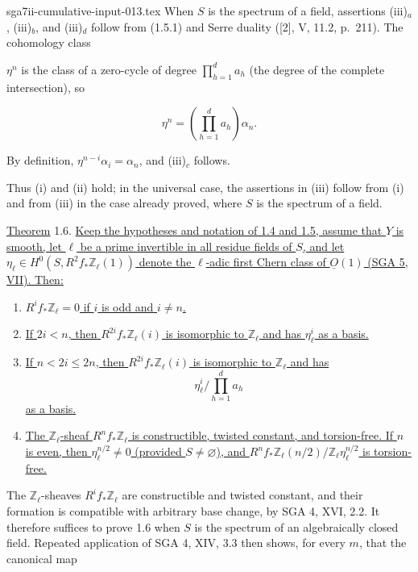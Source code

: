 \begin{filecontents*}{sga7ii-cumulative-input-013.tex}
When $S$ is the spectrum of a field, assertions (iii)$_a$, (iii)$_b$, and
(iii)$_d$ follow from (1.5.1) and Serre duality ([2], V, 11.2, p.~211).
The cohomology class


$\eta^n$ is the class of a zero-cycle of degree
$\prod_{h=1}^d a_h$ (the degree of the complete intersection), so

\begin{equation*}
\eta^n=\left(\prod_{h=1}^d a_h\right)\alpha_n.
\end{equation*}

By definition, $\eta^{n-i}\alpha_i=\alpha_n$, and (iii)$_c$ follows.

Thus (i) and (ii) hold; in the universal case, the assertions in (iii)
follow from (i) and from (iii) in the case already proved, where $S$ is the
spectrum of a field.

\underline{Theorem} 1.6. \underline{Keep the hypotheses and notation of
1.4 and 1.5, assume that $Y$ is smooth, let $\ell$ be a prime invertible in
all residue fields of $S$, and let
$\eta_\ell\in H^0(S,R^2f_*\mathbb Z_\ell(1))$ denote the $\ell$-adic first
Chern class of $\underline O(1)$ (SGA 5, VII).  Then:}

\begin{enumerate}[label=(\roman*),leftmargin=2.6em]
\item \underline{$R^if_*\mathbb Z_\ell=0$ if $i$ is odd and $i\ne n$.}

\item \underline{If $2i<n$, then $R^{2i}f_*\mathbb Z_\ell(i)$ is
isomorphic to $\mathbb Z_\ell$ and has $\eta_\ell^i$ as a basis.}

\item \underline{If $n<2i\leq2n$, then
$R^{2i}f_*\mathbb Z_\ell(i)$ is isomorphic to $\mathbb Z_\ell$ and has}
\begin{equation*}
\eta_\ell^i\bigg/\prod_{h=1}^d a_h
\end{equation*}
\underline{as a basis.}

\item \underline{The $\mathbb Z_\ell$-sheaf $R^nf_*\mathbb Z_\ell$ is
constructible, twisted constant, and torsion-free.  If $n$ is even, then
$\eta_\ell^{n/2}\ne0$ (provided $S\ne\varnothing$), and
$R^nf_*\mathbb Z_\ell(n/2)/\mathbb Z_\ell\eta_\ell^{n/2}$ is torsion-free.}
\end{enumerate}

The $\mathbb Z_\ell$-sheaves $R^if_*\mathbb Z_\ell$ are constructible and
twisted constant, and their formation is compatible with arbitrary base
change, by SGA 4, XVI, 2.2.  It therefore suffices to prove 1.6 when $S$ is
the spectrum of an algebraically closed field.  Repeated application of
SGA 4, XIV, 3.3 then shows, for every $m$, that the canonical map


\end{filecontents*}

